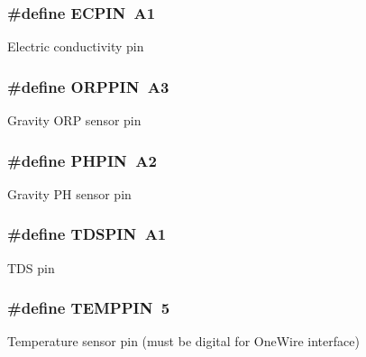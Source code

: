 \subsubsection[{\texorpdfstring{E\+C\+P\+IN}{ECPIN}}]{\setlength{\rightskip}{0pt plus 5cm}\#define E\+C\+P\+IN~A1}\hypertarget{group___p_i_n___s_e_t_t_i_n_g_s_ga9eea325c048cdcab4c3b5f9771f7b512}{}\label{group___p_i_n___s_e_t_t_i_n_g_s_ga9eea325c048cdcab4c3b5f9771f7b512}
Electric conductivity pin 
\subsubsection[{\texorpdfstring{O\+R\+P\+P\+IN}{ORPPIN}}]{\setlength{\rightskip}{0pt plus 5cm}\#define O\+R\+P\+P\+IN~A3}\hypertarget{group___p_i_n___s_e_t_t_i_n_g_s_ga2f2dcc0d9b12ba6a368d780187c98017}{}\label{group___p_i_n___s_e_t_t_i_n_g_s_ga2f2dcc0d9b12ba6a368d780187c98017}
Gravity O\+RP sensor pin 
\subsubsection[{\texorpdfstring{P\+H\+P\+IN}{PHPIN}}]{\setlength{\rightskip}{0pt plus 5cm}\#define P\+H\+P\+IN~A2}\hypertarget{group___p_i_n___s_e_t_t_i_n_g_s_ga992fbb764f982b28e19730a8327b67a6}{}\label{group___p_i_n___s_e_t_t_i_n_g_s_ga992fbb764f982b28e19730a8327b67a6}
Gravity PH sensor pin 
\subsubsection[{\texorpdfstring{T\+D\+S\+P\+IN}{TDSPIN}}]{\setlength{\rightskip}{0pt plus 5cm}\#define T\+D\+S\+P\+IN~A1}\hypertarget{group___p_i_n___s_e_t_t_i_n_g_s_gaef0cf2dcc531d0afe308cb1ed8ab951a}{}\label{group___p_i_n___s_e_t_t_i_n_g_s_gaef0cf2dcc531d0afe308cb1ed8ab951a}
T\+DS pin 
\subsubsection[{\texorpdfstring{T\+E\+M\+P\+P\+IN}{TEMPPIN}}]{\setlength{\rightskip}{0pt plus 5cm}\#define T\+E\+M\+P\+P\+IN~5}\hypertarget{group___p_i_n___s_e_t_t_i_n_g_s_ga4ba38e7a40eda1fcddf502aa2265c313}{}\label{group___p_i_n___s_e_t_t_i_n_g_s_ga4ba38e7a40eda1fcddf502aa2265c313}
Temperature sensor pin (must be digital for One\+Wire interface) 